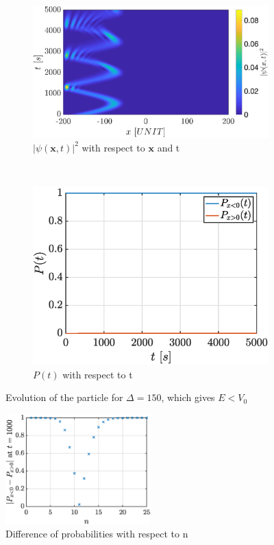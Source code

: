 \documentclass[a4paper,12pt,twoside]{article}
\newcommand{\mbf}[1]{\mathbf{#1}} %
\begin{document}
\begin{figure}[h]
  \centering
  \begin{subfigure}[t]{0.45\textwidth}
    \includegraphics[width=\textwidth]{graphs/iii_evo_E<v0_psi.eps}
    \caption{$|\psi(\mbf{x}, t)|^2$ with respect to $\mbf{x}$ and t}
    \label{fig:iii_evo_E<v0_psi}
  \end{subfigure}
  ~
  \begin{subfigure}[t]{0.45\textwidth}
    \includegraphics[width=\textwidth]{graphs/iii_evo_E<v0_prob.eps}
    \caption{$P(t)$ with respect to t}
    \label{fig:iii_evo_E<v0_prob}
  \end{subfigure}
  \caption{Evolution of the particle for $\Delta = 150$, which gives $E < V_0$}
  \label{fig:iii_evo_E<v0}
\end{figure}


\begin{figure}[h]
  \centering
  \includegraphics[width=0.5\textwidth]{graphs/iii_findn_n.eps}
  \caption{Difference of probabilities with respect to n}
  \label{fig:iii_findn_n}
\end{figure}
\end{document}
